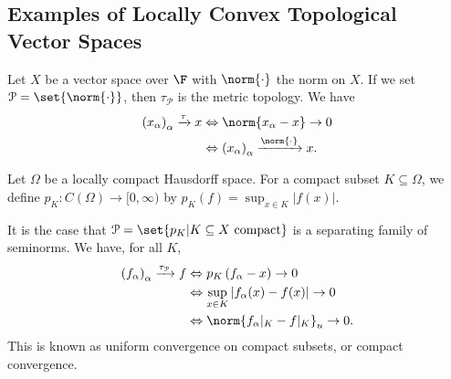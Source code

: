 \documentclass[10pt]{mypackage}
\begin{document}
\subsection{Examples of Locally Convex Topological Vector Spaces}%
\begin{example}
  Let $X$ be a vector space over $\F$ with $\norm{\cdot}$ the norm on $X$. If we set $\mathcal{P} = \set{\norm{\cdot}}$, then $\tau_{\mathcal{P}}$ is the metric topology. We have
  \begin{align*}
    \left(x_{\alpha}\right)_{\alpha}\xrightarrow{\tau}x &\Leftrightarrow \norm{x_{\alpha}- x}\rightarrow 0\\
                                                        &\Leftrightarrow \left(x_{\alpha}\right)_{\alpha}\xrightarrow{\norm{\cdot}} x.
  \end{align*}
\end{example}
\begin{example}
  Let $\Omega$ be a locally compact Hausdorff space. For a compact subset $K\subseteq \Omega$, we define $p_{K}: C\left(\Omega\right)\rightarrow [0,\infty)$ by $p_K(f) = \sup_{x\in K}\left\vert f(x) \right\vert$.\newline

  It is the case that $\mathcal{P} = \set{p_K | K\subseteq X\text{ compact}}$ is a separating family of seminorms. We have, for all $K$,
  \begin{align*}
    \left(f_{\alpha}\right)_{\alpha}\xrightarrow{\tau_{\mathcal{P}}}f &\Leftrightarrow p_{K}\left(f_{\alpha} - x\right)\rightarrow 0\\
                                                                      &\Leftrightarrow \sup_{x\in K} \left\vert f_{\alpha}(x) - f(x) \right\vert \rightarrow 0\\
                                                                      &\Leftrightarrow \norm{f_{\alpha}|_{K} - f|_{K}}_{u}\rightarrow 0.
  \end{align*}
  This is known as uniform convergence on compact subsets, or compact convergence.
\end{example}
\end{document}
